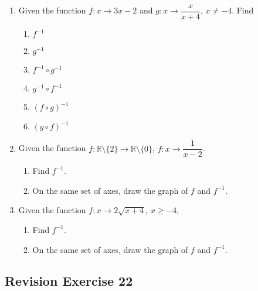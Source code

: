 \documentclass[12pt]{report}
\begin{document}
\begin{multicols}{2}
\begin{enumerate}
    \item Given the function $f:x \to 3x - 2$ and $g:x \to \dfrac{x}{x+4}$, $x \neq -4$.
          Find
          \begin{enumerate}
            \item $f^{-1}$
            \item $g^{-1}$
            \item $f^{-1} \circ g^{-1}$
            \item $g^{-1} \circ f^{-1}$
            \item $(f \circ g)^{-1}$
            \item $(g \circ f)^{-1}$
          \end{enumerate}

    \item Given the function $f: \mathbb{R} \setminus \{2\} \to \mathbb{R} \setminus
            \{0\}$, $f:x \to \dfrac{1}{x-2}$.
          \begin{enumerate}
            \item Find $f^{-1}$.
            \item On the same set of axes, draw the graph of $f$ and $f^{-1}$.
          \end{enumerate}

    \item Given the function $f:x \to 2\sqrt{x+4}$, $x \geq -4$,
          \begin{enumerate}
            \item Find $f^{-1}$.
            \item On the same set of axes, draw the graph of $f$ and $f^{-1}$.
          \end{enumerate}
  \end{enumerate}

\end{multicols}

\subsection*{Revision Exercise 22}

\setlength{\columnseprule}{1pt}
\setlength{\columnsep}{24pt}
\end{document}
